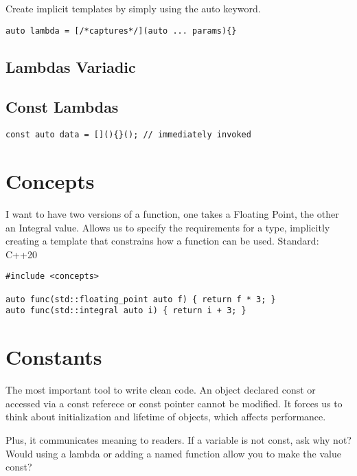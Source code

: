 Create implicit templates by simply using the auto keyword.

\begin{verbatim}
auto lambda = [/*captures*/](auto ... params){}
\end{verbatim}

\subsection{Lambdas Variadic}

\subsection{Const Lambdas}

\begin{verbatim}
const auto data = [](){}(); // immediately invoked
\end{verbatim}

\section{Concepts}

I want to have two versions of a function, one takes a Floating Point, the other an Integral value.
Allows us to specify the requirements for a type, implicitly creating a template
that constrains how a function can be used. Standard: C++20

\begin{verbatim}
#include <concepts>

auto func(std::floating_point auto f) { return f * 3; }
auto func(std::integral auto i) { return i + 3; }
\end{verbatim}

\section{Constants}

The most important tool to write clean code.
An object declared const or accessed via a const referece or const pointer cannot be modified.
It forces us to think about initialization and lifetime of objects, which affects performance. 

Plus, it communicates meaning to readers. 
If a variable is not const, ask why not?
Would using a lambda or adding a named function allow you to make the value const?

